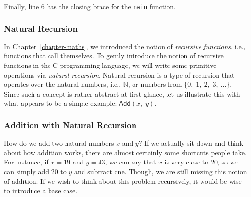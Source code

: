 Finally, line 6 has the closing brace for the \texttt{main} function.

\subsubsection*{Natural Recursion}
In Chapter~\ref{chapter-maths}, we introduced the notion of \textit{recursive functions}, i.e., functions that call themselves. To gently introduce the notion of recursive functions in the C programming language, we will write some primitive operations via \textit{natural recursion}. Natural recursion is a type of recursion that operates over the natural numbers, i.e., $\mathbb{N}$, or numbers from $\{0,\;1,\;2,\;3,\;\ldots\}$. Since such a concept is rather abstract at first glance, let us illustrate this with what appears to be a simple example: $\textsf{Add}(x,\;y)$.

\subsubsection*{Addition with Natural Recursion}
How do we add two natural numbers $x$ and $y$? If we actually sit down and think about how addition works, there are almost certainly some shortcuts people take. For instance, if $x=19$ and $y=43$, we can say that $x$ is very close to $20$, so we can simply add $20$ to $y$ and subtract one. Though, we are still missing this notion of addition. If we wish to think about this problem recursively, it would be wise to introduce a base case.

